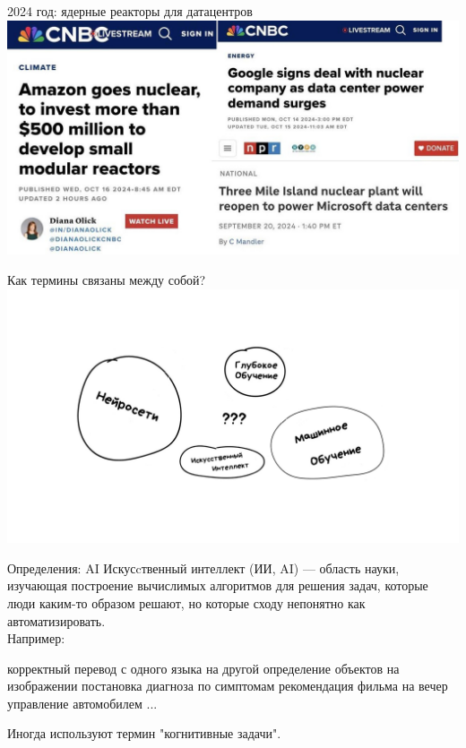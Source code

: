 \documentclass[aspectratio=169, professionalfonts]{beamer}
\begin{document}
\begin{frame}{2024 год: ядерные реакторы для датацентров}
    \centering
    \includegraphics[width=.85\linewidth]{figures/fig2-news.jpg}
\end{frame}

\begin{frame}{Как термины связаны между собой?}
    \centering
    \includegraphics[width=.85\linewidth]{figures/fig3-terms.jpg}
\end{frame}

\begin{frame}{Определения: AI}
    Искусcтвенный интеллект (ИИ, AI) --- область науки, изучающая построение вычислимых
    алгоритмов для решения задач, которые люди каким-то образом решают,
    но которые сходу непонятно как автоматизировать.\\
    Например:
    \begin{outline}
        \1 корректный перевод с одного языка на другой
        \1 определение объектов на изображении
        \1 постановка диагноза по симптомам
        \1 рекомендация фильма на вечер
        \1 управление автомобилем
        \1 ...
    \end{outline}

    Иногда используют термин "когнитивные задачи".
\end{frame}
\end{document}
